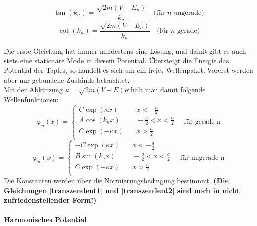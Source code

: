 \documentclass[12pt,twoside,a4paper]{book}
\begin{document}
\begin{equation} \label{transzendent1}
\tan(k_n)=\frac{\sqrt{2m(V-E_n)}}{k_n} \quad \text{(für } n \text{ ungerade)}
\end{equation}
\begin{equation}\label{transzendent2}
\cot(k_n)=\frac{\sqrt{2m(V-E_n)}}{k_n} \quad \text{(für } n \text{ gerade)}
\end{equation}

Die erste Gleichung hat immer mindestens eine L\"{o}sung, und damit gibt es auch stets eine station\"{a}re Mode in diesem Potential. \"{U}bersteigt die Energie das Potential der Topfes, so handelt es sich um ein freies Wellenpaket. Vorerst werden aber nur gebundene Zust\"{a}nde betrachtet.\\
Mit der Abk\"{u}rzung \(\kappa = \sqrt{2m(V-E)}\)erh\"{a}lt man damit folgende Wellenfunktionen:
\begin{equation}
\varphi_n(x)=
\begin{cases}
C\exp(\kappa x) & \quad x<-\frac{a}{2}\\
A\cos(k_n x) & \quad -\frac{a}{2}<x<\frac{a}{2}\\
C\exp(-\kappa x) & \quad x>\frac{a}{2}\\
\end{cases}
\quad \text{für gerade n}
\end{equation}
\begin{equation}
\varphi_n(x)=
\begin{cases}
-C\exp(\kappa x) & \quad x<-\frac{a}{2}\\
B\sin(k_n x) & \quad -\frac{a}{2}<x<\frac{a}{2}\\
C\exp(-\kappa x) & \quad x>\frac{a}{2}\\
\end{cases}
\quad \text{für ungerade n}
\end{equation}
Die Konstanten werden über die Normierungsbedingung bestimnmt.
\textbf{(Die Gleichungen \eqref{transzendent1} und \eqref{transzendent2} sind noch in nicht zufriedenstellender Form!)}


\paragraph{Harmonisches Potential} 

\end{document}
